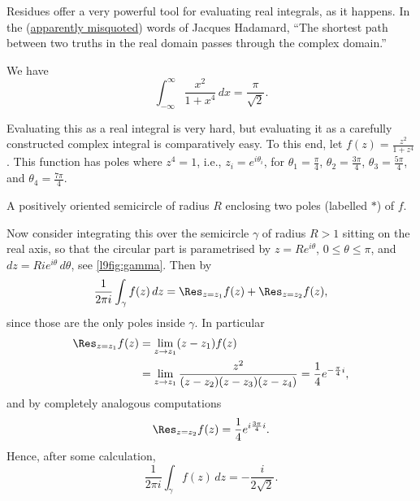 


Residues offer a very powerful tool for evaluating real integrals, as it happens.
In the (\href{https://philosophy.stackexchange.com/a/61924}{apparently misquoted}) words of Jacques Hadamard, ``The shortest path between two truths in the real domain passes through the complex domain.''

\begin{example}
	We have
	\[
		\int_{-\infty}^\infty \frac{x^2}{1 + x^4} \, d x = \frac{\pi}{\sqrt{2}}.
	\]

	Evaluating this as a real integral is very hard, but evaluating it as a carefully constructed complex integral is comparatively easy.
	To this end, let $f(z) = \frac{z^2}{1 + z^4}$.
	This function has poles where $z^4 = 1$, i.e., $z_i = e^{i \theta_i}$, for $\theta_1 = \frac{\pi}{4}$, $\theta_2 = \frac{3 \pi}{4}$, $\theta_3 = \frac{5 \pi}{4}$, and $\theta_4 = \frac{7 \pi}{4}$.

	\begin{marginfigure}

		\caption{\label{l9fig:gamma} A positively oriented semicircle of radius $R$ enclosing two poles (labelled $*$) of $f$.}
	\end{marginfigure}

	Now consider integrating this over the semicircle $\gamma$ of radius $R > 1$ sitting on the real axis, so that the circular part is parametrised by $z = R e^{i \theta}$, $0 \leq \theta \leq \pi$, and $d z = R i e^{i \theta} \, d \theta$, see \autoref{l9fig:gamma}.
	Then by 
	\[
		\frac{1}{2 \pi i} \int_\gamma f(z) \, d z = \Res_{z = z_1} f(z) + \Res_{z = z_2} f(z),
	\]
	since those are the only poles inside $\gamma$.
	In particular
	\begin{align*}
		\Res_{z = z_1} f(z) &= \lim_{z \to z_1} (z - z_1) f(z) \\
		&= \lim_{z \to z_1} \frac{z^2}{(z - z_2) (z - z_3) (z - z_4)} = \frac{1}{4} e^{- \frac{\pi}{4} i},
	\end{align*}
	and by completely analogous computations
	\[
		\Res_{z = z_2} f(z) = \frac{1}{4} e^{i \frac{3 \pi}{4} i}.
	\]
	Hence, after some calculation,
	\[
		\frac{1}{2 \pi i} \int_\gamma f(z) \, d z = - \frac{i}{2 \sqrt{2}}.
	\]


\end{example}
